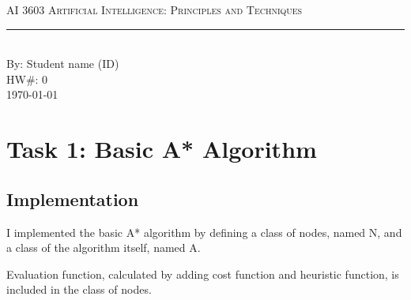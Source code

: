 \documentclass[aps,letterpaper,10pt]{revtex4}
\newcommand{\labtitle}{AI 3603 Artificial Intelligence: Principles and Techniques}
\newcommand{\authorname}{Student name (ID)}
\newcommand{\hw}{0}
\begin{document}


\begin{titlepage}
\begin{center}
{\Large \textsc{\labtitle} \\ \vspace{4pt}}
\rule[13pt]{\textwidth}{1pt} \\ \vspace{150pt}
{\large By: \authorname \\ \vspace{10pt}
HW\#: \hw \\ \vspace{10pt}
\today}
\end{center}
\end{titlepage}
\section{Task 1: Basic A* Algorithm}
\begin{figure}[H]
	  \centering
	  \caption{}
	  \label{fig:oscil}
	\end{figure}
\subsection{Implementation}
I implemented the basic A* algorithm by defining a class of nodes, named N, and a class of the algorithm itself, named A. 

\vspace{3mm}
Evaluation function, calculated by adding cost function and heuristic function, is included in the class of nodes.
\vspace{5mm}
	
	\vspace{3mm}
\end{document}
